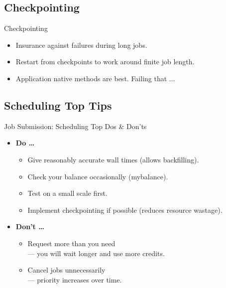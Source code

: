 \subsection{Checkpointing}
\begin{frame}{Checkpointing}
  \begin{itemize}
  \item{Insurance against failures during long jobs.}
  \item{Restart from checkpoints to work around finite job length.}
    \pause
  \item{Application native methods are best. Failing that $\ldots$}
  \end{itemize}
\end{frame}

\subsection{Scheduling Top Tips}
\begin{frame}{Job Submission: Scheduling Top Dos \& Don'ts}
\begin{itemize}
\item{\textbf{Do \ldots}}
\begin{itemize}
\item{Give reasonably accurate wall times (allows \alert{backfilling}).}
\item{Check your balance occasionally (\alert{mybalance}).}
\item{Test on a small scale first.}
\item{Implement \alert{checkpointing} if possible (reduces resource wastage).}
\end{itemize}
\medskip
\item{\textbf{Don't \ldots}}
\begin{itemize}
\item{Request more than you need\hfill\\
\qquad --- you will wait longer and use more credits.}
\item{Cancel jobs unnecessarily\hfill\\
\qquad ---  priority increases over time.}
\end{itemize}
\end{itemize}
\end{frame}

